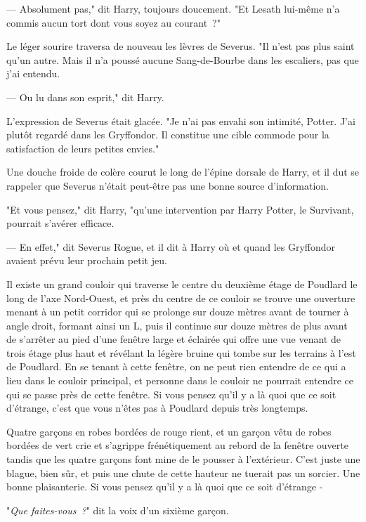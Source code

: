 --- Absolument pas," dit Harry, toujours doucement. "Et Lesath lui-même n'a commis aucun tort dont vous soyez au courant~?"

Le léger sourire traversa de nouveau les lèvres de Severus. "Il n'est pas plus saint qu'un autre. Mais il n'a poussé aucune Sang-de-Bourbe dans les escaliers, pas que j'ai entendu.

--- Ou lu dans son esprit," dit Harry.

L'expression de Severus était glacée. "Je n'ai pas envahi son intimité, Potter. J'ai plutôt regardé dans les Gryffondor. Il constitue une cible commode pour la satisfaction de leurs petites envies."

Une douche froide de colère courut le long de l'épine dorsale de Harry, et il dut se rappeler que Severus n'était peut-être pas une bonne source d'information.

"Et vous pensez," dit Harry, "qu'une intervention par Harry Potter, le Survivant, pourrait s'avérer efficace.

--- En effet," dit Severus Rogue, et il dit à Harry où et quand les Gryffondor avaient prévu leur prochain petit jeu.

\later

Il existe un grand couloir qui traverse le centre du deuxième étage de Poudlard le long de l'axe Nord-Ouest, et près du centre de ce couloir se trouve une ouverture menant à un petit corridor qui se prolonge sur douze mètres avant de tourner à angle droit, formant ainsi un L, puis il continue sur douze mètres de plus avant de s'arrêter au pied d'une fenêtre large et éclairée qui offre une vue venant de trois étage plus haut et révélant la légère bruine qui tombe sur les terrains à l'est de Poudlard. En se tenant à cette fenêtre, on ne peut rien entendre de ce qui a lieu dans le couloir principal, et personne dans le couloir ne pourrait entendre ce qui se passe près de cette fenêtre. Si vous pensez qu'il y a là quoi que ce soit d'étrange, c'est que vous n'êtes pas à Poudlard depuis très longtemps.

Quatre garçons en robes bordées de rouge rient, et un garçon vêtu de robes bordées de vert crie et s'agrippe frénétiquement au rebord de la fenêtre ouverte tandis que les quatre garçons font mine de le pousser à l'extérieur. C'est juste une blague, bien sûr, et puis une chute de cette hauteur ne tuerait pas un sorcier. Une bonne plaisanterie. Si vous pensez qu'il y a là quoi que ce soit d'étrange -

"\emph{Que faites-vous~?}" dit la voix d'un sixième garçon.

